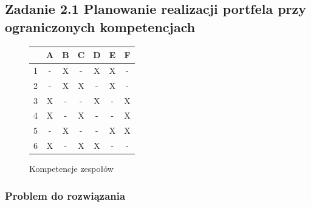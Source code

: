 \subsection{Zadanie 2.1 Planowanie realizacji portfela przy ograniczonych kompetencjach}
\begin{figure}[htb]
\caption{Kompetencje zespołów}
\begin{center}
\begin{tabular}{ | c | c | c | c | c | c | c | }
\hline
  & A & B & C & D & E & F \\ 
 \hline
 1 & - & X & - & X & X & - \\  
 \hline
 2 & - & X & X & - & X & - \\
 \hline  
 3 & X & - & - & X & - & X \\
 \hline  
 4 & X & - & X & - & - & X \\
 \hline  
 5 & - & X & - & - & X & X \\
 \hline  
 6 & X & - & X & X & - & - \\
 \hline
\end{tabular}
\end{center}
\end{figure}
\subsubsection{Problem do rozwiązania}
